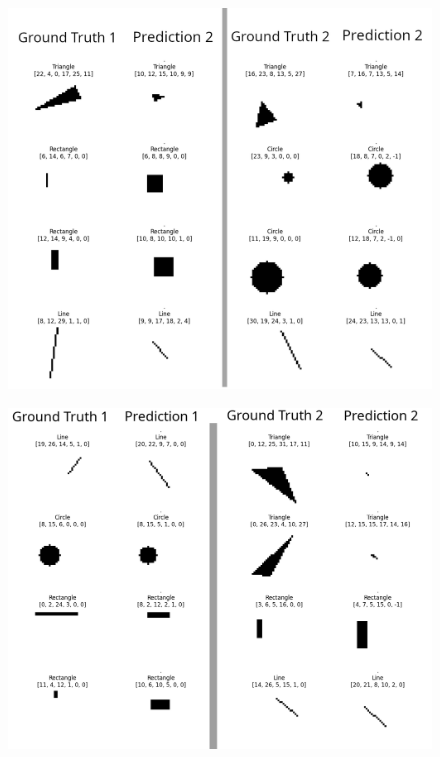 \documentclass[12pt, a4paper, titlepage]{report}
\begin{document}
\begin{figure}[H]
   \includegraphics[width=1.0\textwidth]{../rc/images/all_shapes_approx_visual1_condensed.png}
   \label{fig:results_demonstration1}
\end{figure}

\begin{figure}[H]
   \includegraphics[width=1.0\textwidth]{../rc/images/all_shapes_approx_visual2_condensed.png}
   \label{fig:results_demonstration2}
\end{figure}
\end{document}
